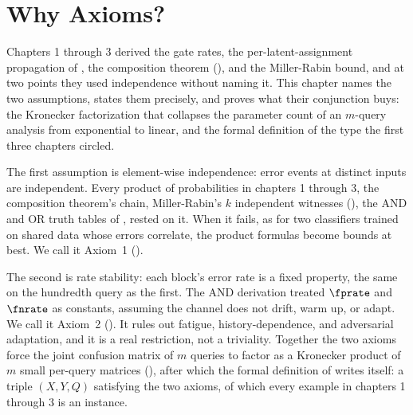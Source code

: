 %

\section{Why Axioms?}
\label{sec:why-axioms}

Chapters 1 through 3 derived the gate rates, the per-latent-assignment
propagation of , the composition theorem
(), and the Miller-Rabin bound, and at two points
they used independence without naming it. This chapter names the two
assumptions, states them precisely, and proves what their conjunction buys: the
Kronecker factorization that collapses the parameter count of an $m$-query
analysis from exponential to linear, and the formal definition of the type the
first three chapters circled.

The first assumption is element-wise independence: error events at distinct
inputs are independent. Every product of probabilities in chapters 1 through 3,
the composition theorem's chain, Miller-Rabin's $k$ independent witnesses
(), the AND and OR truth tables of
, rested on it. When it fails, as for two classifiers
trained on shared data whose errors correlate, the product formulas become
bounds at best. We call it Axiom~1 ().

The second is rate stability: each block's error rate is a fixed property, the
same on the hundredth query as the first. The AND derivation treated $\fprate$
and $\fnrate$ as constants, assuming the channel does not drift, warm up, or
adapt. We call it Axiom~2 (). It rules out fatigue,
history-dependence, and adversarial adaptation, and it is a real restriction,
not a triviality. Together the two axioms force the joint confusion matrix of
$m$ queries to factor as a Kronecker product of $m$ small per-query matrices
(), after which the formal definition of
 writes itself: a triple $(X, Y, Q)$ satisfying
the two axioms, of which every example in chapters 1 through 3 is an instance.
